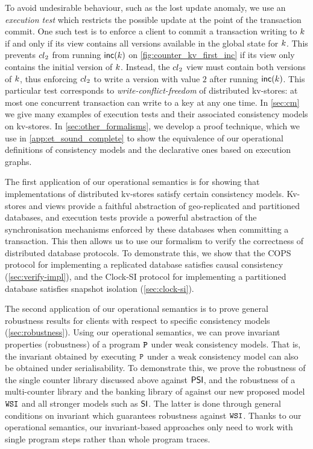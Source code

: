 To avoid undesirable behaviour, such as the lost update anomaly, we
use an {\em execution test} which restricts the possible update at the
point of the transaction commit.  One such test is to enforce a client
to commit a transaction writing to \(k\) if and only if its view
contains all versions available in the global state for \(k\).  This
prevents \({cl}_2\) from running \(\mathsf{inc}(k)\) on
\cref{fig:counter_kv_first_inc} if its view only contains the initial
version of \(k\).  Instead, the \({cl}_2\) view must contain both
versions of \(k\), thus enforcing \({cl}_2\) to write a version with
value \(2\) after running \(\mathsf{inc}(k)\). This particular test
corresponds to \emph{write-conflict-freedom} of distributed kv-stores:
at most one concurrent transaction can write to a key at any one time.
In \cref{sec:cm} we give many examples of execution tests and their
associated consistency models on kv-stores. In \cref{sec:other_formalisms}, we
develop a proof technique, which we use in \cref{app:et_sound_complete} 
to show the equivalence of our operational definitions of consistency models and the 
declarative ones based on  
execution graphs. 

The first application of our operational
semantics is for showing that implementations of distributed
kv-stores satisfy certain consistency models. 
Kv-stores and views provide a 
faithful abstraction of geo-replicated and partitioned
databases, and  execution tests provide a powerful abstraction of the synchronisation mechanisms 
enforced by these databases when committing a transaction. 
This then allows us to use our 
formalism to verify the correctness of distributed database protocols. 
To demonstrate this, we show that the
COPS protocol \citep{cops} for implementing a replicated database satisfies causal consistency  (\cref{sec:verify-impl}), 
and the Clock-SI protocol \citep{clocksi} for implementing a
partitioned database satisfies snapshot isolation (\cref{sec:clock-si}). 


The second application of our operational semantics is to prove
general robustness results for clients with respect to specific consistency models (\cref{sec:robustness}). 
Using our operational semantics, we can prove invariant properties (\eg robustness)
of a program \(\mathtt{P}\) under weak consistency models. 
That is, the invariant obtained by executing \(\mathtt{P}\) under a weak consistency model can also be obtained under serialisability.
To demonstrate this, we prove the robustness of the single
counter library discussed above against \(\mathsf{PSI}\), and the robustness of a multi-counter library and the banking library of \citet{bank-example-wsi}
against our new proposed model \(\mathtt{WSI}\) and all stronger models such as \(\mathsf{SI}\).
The latter is done through general conditions on invariant which guarantees robustness against \( \mathtt{WSI} \).
Thanks to our operational semantics, our invariant-based approaches only need to work with single program steps rather than whole program traces.
